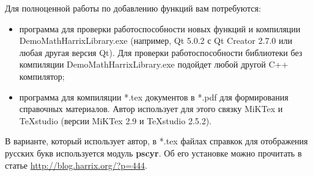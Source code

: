 \documentclass[a4paper,12pt]{article}
\begin{document}
Для полноценной работы по добавлению функций вам потребуются:
\begin{itemize}
\item программа для проверки работоспособности новых функций и компиляции DemoMathHarrixLibrary.exe (например, Qt 5.0.2 с Qt Creator 2.7.0 или любая другая версия Qt). Для проверки работоспособности библиотеки без компиляции DemoMathHarrixLibrary.exe подойдет любой другой C++ компилятор;
\item программа для компиляции *.tex документов в *.pdf для формирования справочных материалов. Автор использует для этого связку MiKTex и TeXstudio (версии MiKTex 2.9 и TeXstudio 2.5.2).
\end{itemize}

В варианте, который использует автор, в *.tex файлах справкок для отображения русских букв используется модуль \textbf{pscyr}. Об его установке можно прочитать в статье \href{http://blog.harrix.org/?p=444}{http://blog.harrix.org/?p=444}.
\end{document}
